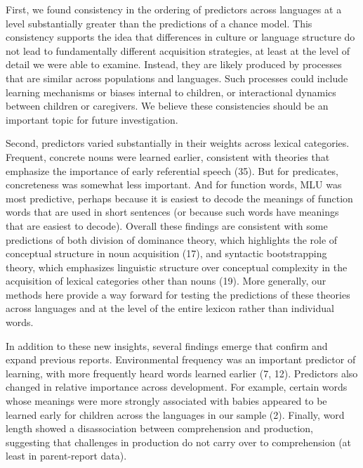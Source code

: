 \documentclass[english,man]{apa6}
\theoremstyle{definition}
\theoremstyle{definition}
\theoremstyle{definition}
\theoremstyle{remark}
\begin{document}
First, we found consistency in the ordering of predictors across
languages at a level substantially greater than the predictions of a
chance model. This consistency supports the idea that differences in
culture or language structure do not lead to fundamentally different
acquisition strategies, at least at the level of detail we were able to
examine. Instead, they are likely produced by processes that are similar
across populations and languages. Such processes could include learning
mechanisms or biases internal to children, or interactional dynamics
between children or caregivers. We believe these consistencies should be
an important topic for future investigation.

Second, predictors varied substantially in their weights across lexical
categories. Frequent, concrete nouns were learned earlier, consistent
with theories that emphasize the importance of early referential speech
(35). But for predicates, concreteness was somewhat less important. And
for function words, MLU was most predictive, perhaps because it is
easiest to decode the meanings of function words that are used in short
sentences (or because such words have meanings that are easiest to
decode). Overall these findings are consistent with some predictions of
both division of dominance theory, which highlights the role of
conceptual structure in noun acquisition (17), and syntactic
bootstrapping theory, which emphasizes linguistic structure over
conceptual complexity in the acquisition of lexical categories other
than nouns (19). More generally, our methods here provide a way forward
for testing the predictions of these theories across languages and at
the level of the entire lexicon rather than individual words.

In addition to these new insights, several findings emerge that confirm
and expand previous reports. Environmental frequency was an important
predictor of learning, with more frequently heard words learned earlier
(7, 12). Predictors also changed in relative importance across
development. For example, certain words whose meanings were more
strongly associated with babies appeared to be learned early for
children across the languages in our sample (2). Finally, word length
showed a disassociation between comprehension and production, suggesting
that challenges in production do not carry over to comprehension (at
least in parent-report data).
\end{document}
